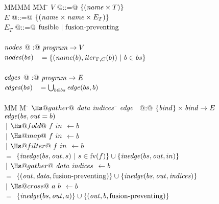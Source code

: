 \begin{figure}
\begin{tabbing}
MMMM       \= MM  \= \kill
$V$ \> @::=@ \> $\{(\mathit{name} \times T)\}$ \\
$E$ \> @::=@ \> $\{(\mathit{name} \times \mathit{name} \times E_T)\}$ \\
$E_T$ \> @::=@ \> $\mathrm{fusible} ~|~ \mbox{fusion-preventing}$ \\
\\
$\mathit{nodes}$     \> @  :@ \> $\mathit{program} \to V$                          \\
$\mathit{nodes}(bs)$ \> $~~= \{(\mathit{name}(b), \mathit{iter}_{\Gamma,C}(b)) ~|~ b \in bs\}$
\\
\\
$\mathit{edges}$     \> @  :@ \> $\mathit{program} \to E$                          \\
$\mathit{edges}(bs)$ \> $~~= \bigcup_{b \in bs} \mathit{edge}(bs, b)$
\\
\\
MM             \= M \= $\Hs@gather@~\data~\indices$ \= \kill
$\mathit{edge}$      \> ~@:@ \> $\{\mathit{bind}\} \times \mathit{bind} \to E$ \\
$\mathit{edge}(bs, \mathit{out} = b)$ \\
   \> $~|$ \> $\Hs@fold@~f~in$ \> $\gets b$ \\
   \> $~|$ \> $\Hs@map@~f~in$ \> $\gets b$ \\
   \> $~|$ \> $\Hs@filter@~f~in$ \> $\gets b$ \\
    \> $=$    \> $\{\mathit{inedge}(bs,\mathit{out},s) ~|~ s \in \textrm{fv}(f)\} \cup \{\mathit{inedge}(bs, \mathit{out}, in) \}$
\\[1ex]
   \> $~|$ \> $\Hs@gather@~\data~\indices$ \> $\gets b$ \\
    \> $=$    \> $\{(\mathit{out},\mathit{data}, \mbox{fusion-preventing}) \} \cup \{\mathit{inedge}(bs, \mathit{out}, \mathit{indices}) \}$      
\\[1ex]
   \> $~|$ \> $\Hs@cross@~a~b$ \> $\gets b$ \\
    \> $=$    \> $\{\mathit{inedge}(bs, \mathit{out}, a) \}           \cup      \{(\mathit{out}, b, \mbox{fusion-preventing}) \}$

\end{tabbing}
\end{figure}
